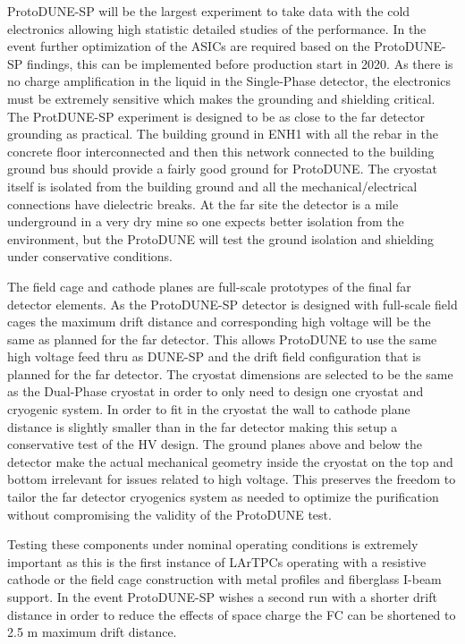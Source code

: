 ProtoDUNE-SP will be the largest experiment to take data with the cold electronics allowing high statistic detailed studies of the performance. In the event further optimization of the ASICs are required based on the ProtoDUNE-SP findings, this can be implemented before production start in 2020. As there is no charge amplification in the liquid in the Single-Phase detector, the electronics must be extremely sensitive which makes the grounding and shielding critical. The ProtDUNE-SP experiment is designed to be as close to the far detector grounding as practical. The building ground in ENH1 with all the rebar in the concrete floor interconnected and then this network connected to the building ground bus should provide a fairly good ground for ProtoDUNE. The cryostat itself is isolated from the building ground and all the mechanical/electrical connections have dielectric breaks. At the far site the detector is a mile underground in a very dry mine so one expects better isolation from the environment, but the ProtoDUNE will test the ground isolation and shielding under conservative conditions.

The field cage and cathode planes are full-scale prototypes of the final far detector elements. As the ProtoDUNE-SP detector is designed with full-scale field cages the maximum drift distance and corresponding high voltage will be the same as planned for the far detector. This allows ProtoDUNE to use the same high voltage feed thru as DUNE-SP and the drift field configuration that is planned for the far detector. The cryostat dimensions are selected to be the same as the Dual-Phase cryostat in order to only need to design one cryostat and cryogenic system. In order to fit in the cryostat the wall to cathode plane distance is slightly smaller than in the far detector making this setup a conservative test of the HV design. The ground planes above and below the detector make the actual mechanical geometry inside the cryostat on the top and bottom irrelevant for issues related to high voltage. This preserves the freedom to tailor the far detector cryogenics system as needed to optimize the purification without compromising the validity of the ProtoDUNE test. 

Testing these components under nominal operating conditions is extremely important as this is the first instance of LArTPCs operating with a resistive cathode or the field cage construction with metal profiles and fiberglass I-beam support. In the event ProtoDUNE-SP wishes a second run with a shorter drift distance in order to reduce the effects of space charge the FC can be shortened to 2.5 m maximum drift distance.


